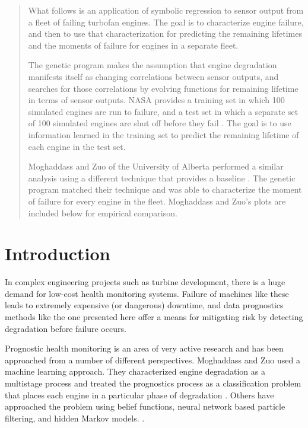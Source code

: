 \documentclass{acm_proc_article-sp}
\begin{document}
\maketitle
\begin{abstract}

What follows is an application of symbolic regression to sensor output from a fleet of failing turbofan engines. The goal is to characterize engine failure, and then to use that characterization for predicting the remaining lifetimes and the moments of failure for engines in a separate fleet.

The genetic program makes the assumption that engine degradation manifests itself as changing correlations between sensor outputs, and searches for those correlations by evolving functions for remaining lifetime in terms of sensor outputs. NASA provides a training set in which 100 simulated engines are run to failure, and a test set in which a separate set of 100 simulated engines are shut off before they fail \cite{nasa}. The goal is to use information learned in the training set to predict the remaining lifetime of each engine in the test set.

Moghaddass and Zuo of the University of Alberta performed a similar analysis using a different technique that provides a baseline \cite{Mog}. The genetic program matched their technique and was able to characterize the moment of failure for every engine in the fleet. Moghaddass and Zuo's plots are included below for empirical comparison.


\end{abstract}



\section{Introduction}
In complex engineering projects such as turbine development, there is a huge demand for low-cost health monitoring systems. Failure of machines like these leads to extremely expensive (or dangerous) downtime, and data prognostics methods like the one presented here offer a means for mitigating risk by detecting degradation before failure occurs.\cite{Mog}

Prognostic health monitoring is an area of very active research and has been approached from a number of different perspectives. Moghaddass and Zuo used a machine learning approach. They characterized engine degradation as a multistage process and treated the prognostics process as a classification problem that places each engine in a particular phase of degradation \cite{Mog}. Others have approached the problem using belief functions, neural network based particle filtering, and hidden Markov models. \cite{nasa} \cite{oil}.
\end{document}

